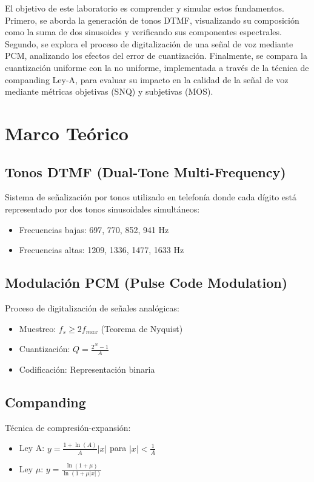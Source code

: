 \documentclass[journal]{IEEEtran} %
\begin{document}
El objetivo de este laboratorio es comprender y simular estos fundamentos. Primero, se aborda la generación de tonos DTMF, visualizando su composición como la suma de dos sinusoides y verificando sus componentes espectrales. Segundo, se explora el proceso de digitalización de una señal de voz mediante PCM, analizando los efectos del error de cuantización. Finalmente, se compara la cuantización uniforme con la no uniforme, implementada a través de la técnica de companding Ley-A, para evaluar su impacto en la calidad de la señal de voz mediante métricas objetivas (SNQ) y subjetivas (MOS).

\section{Marco Teórico}

\subsection{Tonos DTMF (Dual-Tone Multi-Frequency)}
Sistema de señalización por tonos utilizado en telefonía donde cada dígito está representado por dos tonos sinusoidales simultáneos:
\begin{itemize}
    \item Frecuencias bajas: 697, 770, 852, 941 Hz
    \item Frecuencias altas: 1209, 1336, 1477, 1633 Hz
\end{itemize}

\subsection{Modulación PCM (Pulse Code Modulation)}
Proceso de digitalización de señales analógicas:
\begin{itemize}
    \item Muestreo: $f_s \geq 2f_{max}$ (Teorema de Nyquist)
    \item Cuantización: $Q = \frac{2^N - 1}{A}$
    \item Codificación: Representación binaria
\end{itemize}

\subsection{Companding}
Técnica de compresión-expansión:
\begin{itemize}
    \item Ley A: $y = \frac{1 + \ln(A)}{A}|x|$ para $|x| < \frac{1}{A}$
    \item Ley $\mu$: $y = \frac{\ln(1 + \mu)}{\ln(1 + \mu|x|)}$
\end{itemize}
\end{document}
